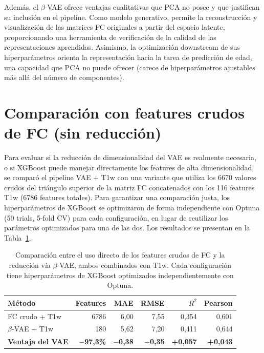 Además, el $\beta$-VAE ofrece ventajas cualitativas que PCA no posee y que justifican su inclusión en el pipeline. Como modelo generativo, permite la reconstrucción y visualización de las matrices FC originales a partir del espacio latente, proporcionando una herramienta de verificación de la calidad de las representaciones aprendidas. Asimismo, la optimización downstream de sus hiperparámetros orienta la representación hacia la tarea de predicción de edad, una capacidad que PCA no puede ofrecer (carece de hiperparámetros ajustables más allá del número de componentes).


\section{Comparación con features crudos de FC (sin reducción)}
\label{sec:res_raw_fc}

Para evaluar si la reducción de dimensionalidad del VAE es realmente necesaria, o si XGBoost puede manejar directamente los features de alta dimensionalidad, se comparó el pipeline VAE + T1w con una variante que utiliza los 6670 valores crudos del triángulo superior de la matriz FC concatenados con los 116 features T1w (6786 features totales). Para garantizar una comparación justa, los hiperparámetros de XGBoost se optimizaron de forma independiente con Optuna (50 trials, 5-fold CV) para cada configuración, en lugar de reutilizar los parámetros optimizados para una de las dos. Los resultados se presentan en la Tabla~\ref{tab:raw_fc_vs_vae}.

\begin{table}[H]
\centering
\caption{Comparación entre el uso directo de los features crudos de FC y la reducción vía $\beta$-VAE, ambos combinados con T1w. Cada configuración tiene hiperparámetros de XGBoost optimizados independientemente con Optuna.}
\label{tab:raw_fc_vs_vae}
\begin{tabular}{lrrrrr}
\toprule
\textbf{Método} & \textbf{Features} & \textbf{MAE} & \textbf{RMSE} & \textbf{$R^2$} & \textbf{Pearson} \\
\midrule
FC crudo + T1w & 6786 & 6,00 & 7,55 & 0,354 & 0,601 \\
$\beta$-VAE + T1w & 180 & 5,62 & 7,20 & 0,411 & 0,644 \\
\midrule
\textbf{Ventaja del VAE} & \textbf{$-$97,3\%} & \textbf{$-$0,38} & \textbf{$-$0,35} & \textbf{+0,057} & \textbf{+0,043} \\
\bottomrule
\end{tabular}
\end{table}

